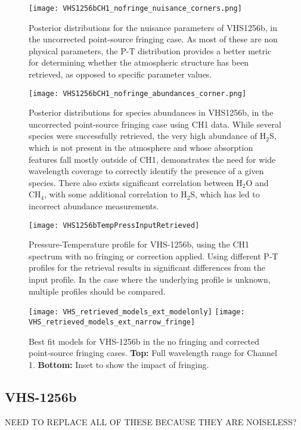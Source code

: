 \begin{figure}[h]
	\centering
	\texttt{[image: VHS1256bCH1\_nofringe\_nuisance\_corners.png]}
	\caption{Posterior distributions for the nuisance parameters of VHS1256b, in the uncorrected point-source fringing case. As most of these are non physical parameters, the P-T distribution provides a better metric for determining whether the atmospheric structure has been retrieved, as opposed to specific parameter values. }
	\label{fig:postVHS_nuisance}
\end{figure}
\begin{figure}[h]
	\centering
	\texttt{[image: VHS1256bCH1\_nofringe\_abundances\_corner.png]}
	\caption{Posterior distributions for species abundances in VHS1256b, in the uncorrected point-source fringing case using CH1 data. While several species were successfully retrieved, the very high abundance of H$_{2}$S, which is not present in the atmosphere and whose absorption features fall mostly outside of CH1, demonstrates the need for wide wavelength coverage to correctly identify the presence of a given species. There also exists significant correlation between H$_{2}$O and CH$_{4}$, with some additional correlation to H$_{2}$S, which has led to incorrect abundance measurements.}
	\label{fig:postVHS_abundances}
\end{figure}
\begin{figure}[h]
	\centering
	\texttt{[image: VHS1256bTempPressInputRetrieved]}
	\caption{Pressure-Temperature profile for VHS-1256b, using the CH1 spectrum with no fringing or correction applied. Using different P-T profiles for the retrieval results in significant differences from the input profile. In the case where the underlying profile is unknown, multiple profiles should be compared.}
	\label{fig:presVHS}
\end{figure}
\begin{figure}[h]
	\centering
	\texttt{[image: VHS\_retrieved\_models\_ext\_modelonly]}
	\texttt{[image: VHS\_retrieved\_models\_ext\_narrow\_fringe]}
	\caption{Best fit models for VHS-1256b in the no fringing and corrected point-source fringing cases. \textbf{Top:} Full wavelength range for Channel 1. \textbf{Bottom:} Inset to show the impact of fringing.}
	\label{fig:bestfitVHS}
\end{figure}

\subsection{VHS-1256b}
NEED TO REPLACE ALL OF THESE BECAUSE THEY ARE NOISELESS?
